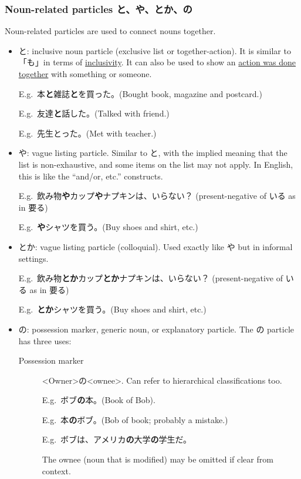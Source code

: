 \documentclass[../nihongo-gakushuu-kyouzai.tex]{subfiles}
\begin{document}
\subsubsection{Noun-related particles と、や、とか、の}\label{sec:noun-related-particles}
Noun-related particles are used to connect nouns together.
\begin{itemize}
    \item と: inclusive noun particle (exclusive list or together-action). It is similar to 「も」in terms of \ul{inclusivity}. It can also be used to show an \ul{action was done together} with something or someone.

    E.g.\ 本\textbf{と}雑誌\textbf{と}を買った。(Bought book, magazine and postcard.)

    E.g.\ 友達\textbf{と}話した。(Talked with friend.)

    E.g.\ 先生とった。(Met with teacher.)
    \item や: vague listing particle. Similar to と, with the implied meaning that the list is non-exhaustive, and some items on the list may not apply. In English, this is like the ``and/or, etc.'' constructs.

    E.g.\ 飲み物\textbf{や}カップ\textbf{や}ナプキンは、いらない？ (present-negative of いる as in 要る)

    E.g.\ \textbf{や}シャツを買う。(Buy shoes and shirt, etc.)
    \item とか: vague listing particle (colloquial). Used exactly like や but in informal settings.

    E.g.\ 飲み物\textbf{とか}カップ\textbf{とか}ナプキンは、いらない？ (present-negative of いる as in 要る)

    E.g.\ \textbf{とか}シャツを買う。(Buy shoes and shirt, etc.)
    \item の: possession marker, generic noun, or explanatory particle. The の particle has three uses:
    \begin{description}
        \item[Possession marker] <Owner>の<ownee>. Can refer to hierarchical classifications too.

        E.g.\ ボブ\textbf{の}本。(Book of Bob).

        E.g.\ 本\textbf{の}ボブ。(Bob of book; probably a mistake.)

        E.g.\ ボブは、アメリカ\textbf{の}大学\textbf{の}学生だ。

        The ownee (noun that is modified) may be omitted if clear from context.


\end{description}
\end{itemize}
\end{document}
